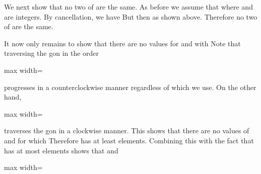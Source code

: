 \documentclass[11pt,oneside]{article}
\begin{document}
\begin{BookBody}
We next show that no two of  are the same. As before we assume that  where  and  are integers. By cancellation, we have  But then  as shown above. Therefore no two of  are the same.

It now only remains to show that there are no values for  and  with  Note that traversing the gon in the order

\begin{center}\begin{adjustbox}{max width=\linewidth}\end{adjustbox}\end{center}

\noindent progresses in a counterclockwise manner regardless of which  we use. On the other hand,

\begin{center}\begin{adjustbox}{max width=\linewidth}\end{adjustbox}\end{center}

\noindent traverses the gon in a clockwise manner. This shows that there are no values of  and  for which  Therefore has at least  elements. Combining this with the fact that  has at most  elements shows that  and

\begin{center}\begin{adjustbox}{max width=\linewidth}\end{adjustbox}\end{center} \BookEnd{\blacklozenge}


\end{BookBody}
\end{document}
